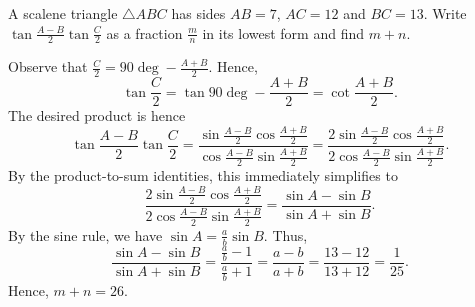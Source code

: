 \begin{question}[26]\label{Q::2024-S-1-25}
    A scalene triangle $\triangle ABC$ has sides $AB = 7$, $AC = 12$ and $BC = 13$. Write $\tan \frac{A-B}{2} \tan \frac{C}{2}$ as a fraction $\frac{m}{n}$ in its lowest form and find $m + n$.

    \begin{center}
    \end{center}
\end{question}
\begin{solution*}
    Observe that $\frac{C}{2} = 90\deg - \frac{A + B}{2}$. Hence, \[\tan \frac{C}{2} = \tan{90\deg - \frac{A + B}{2}} = \cot \frac{A + B}{2}.\] The desired product is hence \[\tan \frac{A-B}{2} \tan \frac{C}{2} = \frac{\sin \frac{A-B}{2} \cos \frac{A+B}{2}}{\cos \frac{A-B}{2} \sin \frac{A+B}{2}} = \frac{2\sin \frac{A-B}{2} \cos \frac{A+B}{2}}{2\cos \frac{A-B}{2} \sin \frac{A+B}{2}}.\] By the product-to-sum identities, this immediately simplifies to \[\frac{2\sin \frac{A-B}{2} \cos \frac{A+B}{2}}{2\cos \frac{A-B}{2} \sin \frac{A+B}{2}} = \frac{\sin A - \sin B}{\sin A + \sin B}.\] By the sine rule, we have $\sin A = \frac{a}{b} \sin B$. Thus, \[\frac{\sin A - \sin B}{\sin A + \sin B} = \frac{\frac{a}{b} - 1}{\frac{a}{b} + 1} = \frac{a - b}{a + b} = \frac{13 - 12}{13 + 12} = \frac{1}{25}.\] Hence, $m + n = 26$.
\end{solution*}